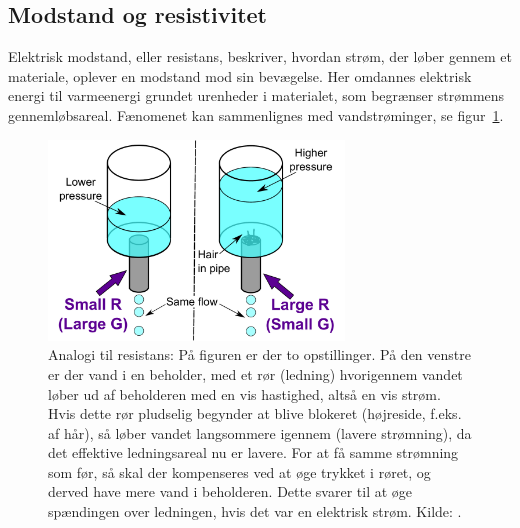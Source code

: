 \subsection{Modstand og resistivitet} \label{ting}
Elektrisk modstand, eller resistans, beskriver, hvordan strøm, der løber gennem et materiale, oplever en modstand mod sin bevægelse. Her omdannes elektrisk energi til varmeenergi grundet urenheder i materialet, som begrænser strømmens gennemløbsareal. Fænomenet kan sammenlignes med vandstrøminger, se figur~\ref{fig:geo_hydraulican}.
\begin{figure}[h]
    \centering
    \includegraphics[width = 0.7\textwidth]{Geo/Figurer/ResistanceHydraulicAnalogy.pdf}
    \caption{Analogi til resistans: På figuren er der to opstillinger. På den venstre er der vand i en beholder, med et rør (ledning) hvorigennem vandet løber ud af beholderen med en vis hastighed, altså en vis strøm. Hvis dette rør pludselig begynder at blive blokeret (højreside, f.eks. af hår), så løber vandet langsommere igennem (lavere strømning), da det effektive ledningsareal nu er lavere. For at få samme strømning som før, så skal der kompenseres ved at øge trykket i røret, og derved have mere vand i beholderen. Dette svarer til at øge spændingen over ledningen, hvis det var en elektrisk strøm. Kilde: \cite{ElectricalResistanceConductance}.
    }
    \label{fig:geo_hydraulican}
\end{figure}

